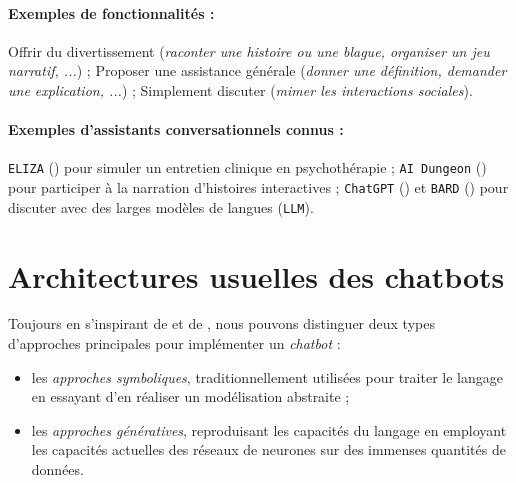 			\paragraph{Exemples de fonctionnalités :}
				
				Offrir du divertissement (\textit{raconter une histoire ou une blague, organiser un jeu narratif, ...}) ;
				Proposer une assistance générale (\textit{donner une définition, demander une explication, ...}) ;
				Simplement discuter (\textit{mimer les interactions sociales}).
			
			\paragraph{Exemples d'assistants conversationnels connus :}
				\texttt{ELIZA} (\cite{weizenbaum:1966:eliza-computer-program}) pour simuler un entretien clinique en psychothérapie ;
				\texttt{AI Dungeon} (\cite{latitude-inc.-oasis-tech-inc.:2019:ai-dungeon}) pour participer à la narration d'histoires interactives ;
				\texttt{ChatGPT} (\cite{openai:2023:chatgpt}) et \texttt{BARD} (\cite{google:2023:bard-chat-based}) pour discuter avec des larges modèles de langues (\texttt{LLM}).
	
	
	\section{Architectures usuelles des chatbots}
	\label{annex:B.2-CHATBOT-ARCHITECTURES}

		Toujours en s'inspirant de \cite{chen-etal:2017:survey-dialogue-systems} et de \cite{adamopoulou-moussiades:2020:overview-chatbot-technology}, nous pouvons distinguer deux types d'approches principales pour implémenter un \textit{chatbot} :
		\begin{itemize}
			\item les \textit{approches symboliques}, traditionnellement utilisées pour traiter le langage en essayant d'en réaliser un modélisation abstraite ;
			\item les \textit{approches génératives}, reproduisant les capacités du langage en employant les capacités actuelles des réseaux de neurones sur des immenses quantités de données.
		\end{itemize}
		
